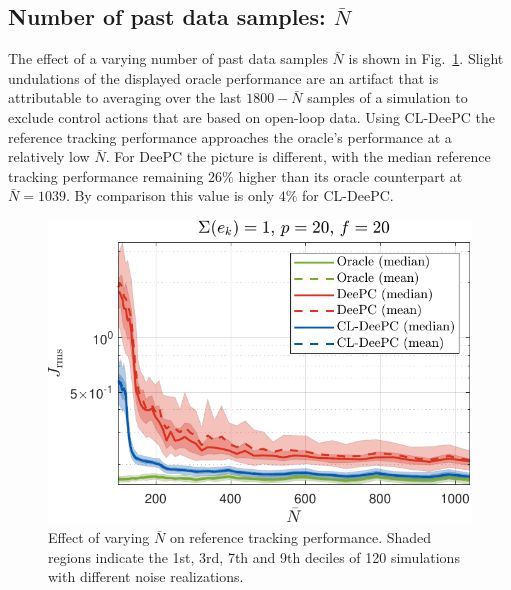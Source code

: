 \subsection{Number of past data samples: $\bar{N}$}
\noindent The effect of a varying number of past data samples $\bar{N}$ is shown in Fig.~\ref{fig:varying_Nbar}. Slight undulations of the displayed oracle performance are an artifact that is attributable to averaging over the last $1800-\bar{N}$ samples of a simulation to exclude control actions that are based on open-loop data. Using \ac{CL-DeePC} the reference tracking performance approaches the oracle's performance at a relatively low $\bar{N}$. For \ac{DeePC} the picture is different, with the median reference tracking performance remaining $26\%$ higher than its oracle counterpart at $\bar{N}=1039$. By comparison this value is only $4\%$ for \ac{CL-DeePC}.
\begin{figure}[b!]
\begin{center}
\includegraphics[width=\columnwidth]{results/figures/Varying_Nbar_99-1039-50_p_20_f_20_Re_1_Ru_1_Rdu_0_Q_100_R_0_dR_10.pdf}    %
\caption{Effect of varying $\bar{N}$ on reference tracking performance. Shaded regions indicate the 1st, 3rd, 7th and 9th deciles of 120 simulations with different noise realizations.\\}  %
\label{fig:varying_Nbar}                                 %
\end{center}                                 %
\end{figure}

